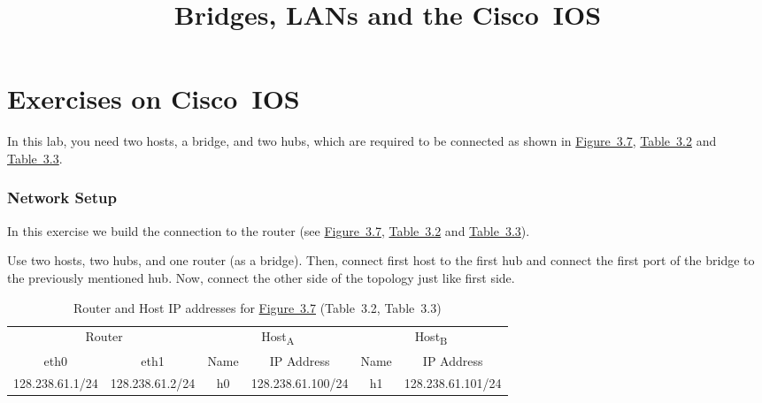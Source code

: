 \documentclass{../UTNetLab}
\title{Bridges, LANs and the Cisco~IOS}
\begin{document}
\part{Exercises on Cisco~IOS}
    In this lab, you need two hosts, a bridge, and two hubs, which are required to be connected as shown in \hyperref[fig:3.7]{Figure~3.7}, \hyperref[tab:3.2]{Table~3.2} and \hyperref[tab:3.3]{Table~3.3}.

\section{Network Setup}
    In this exercise we build the connection to the router (see \hyperref[fig:3.7]{Figure~3.7}, \hyperref[tab:3.2]{Table~3.2} and \hyperref[tab:3.3]{Table~3.3}).

    Use two hosts, two hubs, and one router (as a bridge).
    Then, connect first host to the first hub and connect the first port of the bridge to the previously mentioned hub.
    Now, connect the other side of the topology just like first side.

    \begin{table}[H]
        \caption{Router and Host IP addresses for \hyperref[fig:3.7]{Figure~3.7} (Table~3.2\label{tab:3.2}, Table~3.3\label{tab:3.3})}
        \centering
        \begin{tabular}{ *2c|*2c|*2c }
            \hline \hline
            \multicolumn{2}{c|}{Router} & \multicolumn{2}{c|}{Host\textsubscript{A}} & \multicolumn{2}{c}{Host\textsubscript{B}} \\
            eth0 & eth1 & Name & IP Address & Name & IP Address \\
            \hline 
            128.238.61.1/24 & 128.238.61.2/24 & h0 & 128.238.61.100/24 & h1 & 128.238.61.101/24 \\
            \hline \hline
            \end{tabular}
    \end{table}
\end{document}
